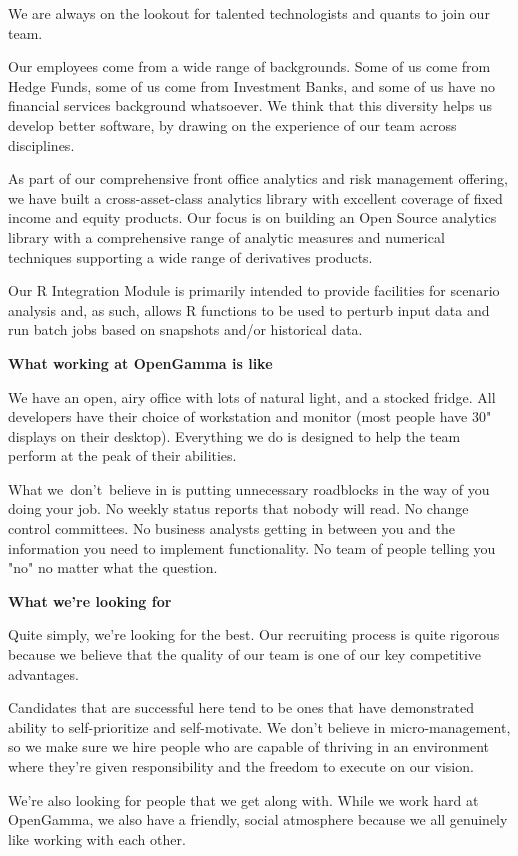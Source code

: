 \documentclass[custom, plainsections]{sciposter}
\begin{document}
\begin{multicols*}{3}
We are always on the lookout for talented technologists and quants to join our team.

Our employees come from a wide range of backgrounds. Some of us come from Hedge Funds, some of us come from Investment Banks, and some of us have no financial services background whatsoever. We think that this diversity helps us develop better software, by drawing on the experience of our team across disciplines.

As part of our comprehensive front office analytics and risk management offering, we have built a cross-asset-class analytics library with excellent coverage of fixed income and equity products. Our focus is on building an Open Source analytics library with a comprehensive range of analytic measures and numerical techniques supporting a wide range of derivatives products.

Our R Integration Module is primarily intended to provide facilities for scenario analysis and, as such, allows R functions to be used to perturb input data and run batch jobs based on snapshots and/or historical data.

\textbf{What working at OpenGamma is like}

We have an open, airy office with lots of natural light, and a stocked fridge. All developers have their choice of workstation and monitor (most people have 30" displays on their desktop). Everything we do is designed to help the team perform at the peak of their abilities.

What we don't believe in is putting unnecessary roadblocks in the way of you doing your job. No weekly status reports that nobody will read. No change control committees. No business analysts getting in between you and the information you need to implement functionality. No team of people telling you "no" no matter what the question.

\textbf{What we're looking for}

Quite simply, we're looking for the best. Our recruiting process is quite rigorous because we believe that the quality of our team is one of our key competitive advantages.

Candidates that are successful here tend to be ones that have demonstrated ability to self-prioritize and self-motivate. We don't believe in micro-management, so we make sure we hire people who are capable of thriving in an environment where they're given responsibility and the freedom to execute on our vision.

We're also looking for people that we get along with. While we work hard at OpenGamma, we also have a friendly, social atmosphere because we all genuinely like working with each other.


\end{multicols*}
\end{document}
